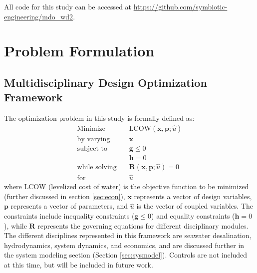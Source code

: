 \documentclass[twocolumn,10pt]{asme2e}
\begin{document}
All code for this study can be accessed at \href{https://github.com/symbiotic-engineering/mdo_wd2}{https://github.com/symbiotic-engineering/mdo\_wd2}.

\section{Problem Formulation}
\subsection{Multidisciplinary Design Optimization Framework}
The optimization problem in this study is formally defined as:
\begin{align*} 
    \text{Minimize} \quad & \text{LCOW}(\mathbf{x},\mathbf{p}; \hat{u})  \\
    \text{by varying} \quad & \mathbf{x}\\
    \text{subject to } \quad &  \mathbf{g} \leq 0 \\
                             &  \mathbf{h} = 0 \\
    \text{while solving} \quad & \mathbf{R}(\mathbf{x},\mathbf{p};\hat{u}) = 0\\
    \text{for } \quad & \hat{u}
    \label{eq:problem}
\end{align*}
\noindent where LCOW (levelized cost of water) is the objective function to be minimized (further discussed in section \ref{sec:econ}), $\mathbf{x}$ represents a vector of design variables, $\mathbf{p}$ represents a vector of parameters, and $\hat{u}$ is the vector of coupled variables. The constraints include inequality constraints ($\mathbf{g} \leq 0$) and equality constraints ($\mathbf{h}=0$), while $\mathbf{R}$ represents the governing equations for different disciplinary modules. The different disciplines represented in this framework are seawater desalination, hydrodynamics, system dynamics, and economics, and are discussed further in the system modeling section (Section \ref{sec:sysmodel}). Controls are not included at this time, but will be included in future work.
\end{document}
